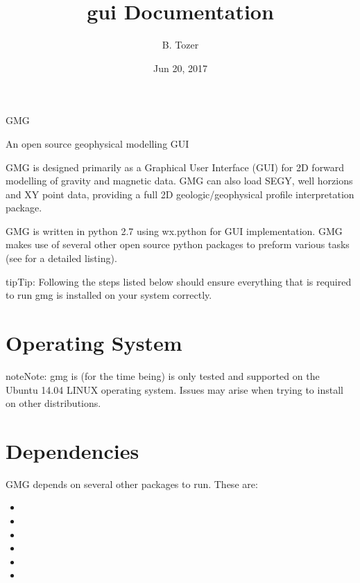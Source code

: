 \documentclass[a4paper,12pt,english]{sphinxmanual}
\title{gui Documentation}
\date{Jun 20, 2017}
\author{B. Tozer}
\begin{document}
\maketitle
\sphinxtableofcontents
{}\label{\detokenize{documentation_home::doc}}


GMG

An open source geophysical modelling GUI



GMG is designed primarily as a Graphical User Interface (GUI) for 2D forward modelling of gravity and magnetic data.
GMG can also load SEGY, well horzions and XY point data, providing a full 2D geologic/geophysical profile interpretation
package.

GMG is written in python 2.7 using wx.python for GUI implementation. GMG makes use of several other open source python
packages to preform various tasks (see  for a detailed listing).





\begin{sphinxadmonition}{tip}{Tip:}
Following the steps listed below should ensure everything that is required to run gmg is installed on your system correctly.
\end{sphinxadmonition}


\chapter{Operating System}
\label{\detokenize{installation:installation}}\label{\detokenize{installation::doc}}\label{\detokenize{installation:operating-system}}\label{\detokenize{installation:id1}}
\begin{sphinxadmonition}{note}{Note:}
gmg is (for the time being) is only tested and supported on the Ubuntu 14.04 LINUX operating system.
Issues may arise when trying to install on other distributions.
\end{sphinxadmonition}


\chapter{Dependencies}
\label{\detokenize{installation:dependencies}}
GMG depends on several other packages to run. These are:
\begin{itemize}
\item {} 

\item {} 

\item {} 

\item {} 

\item {} 

\item {} 

\end{itemize}
\end{document}
